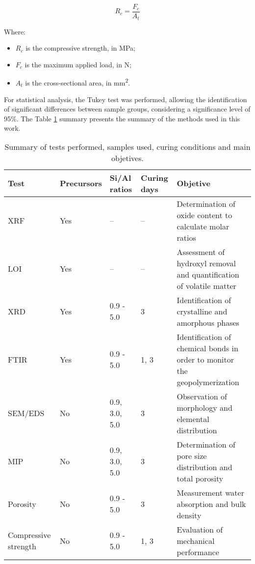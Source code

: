 \begin{equation}
    \label{eq:compressive_strength}
    R_c = \frac{F_c}{A_t}
\end{equation}

Where:
\begin{itemize}
    \item $R_c$ is the compressive strength, in MPa;
    \item $F_c$ is the maximum applied load, in N;
    \item $A_t$ is the cross-sectional area, in mm\textsuperscript{2}.
\end{itemize}

For statistical analysis, the Tukey test was performed, allowing the identification of significant differences between sample groups, considering a significance level of 95\%.
The Table \ref{tab:tests_summary} summary presents the summary of the methods used in this work.

\begin{table}[H]
    \centering
    \caption{Summary of tests performed, samples used, curing conditions and main objetives.}
    \label{tab:tests_summary}
    \begin{tabular}{p{2.5cm} p{2cm} p{2.5cm} p{2.5cm} p{4.5cm}}
    \hline
        Test & Precursors & Si/Al ratios & Curing days & Objetive \\
        \hline
        XRF & Yes & -- & -- & Determination of oxide content to calculate molar ratios \\
        LOI & Yes & -- & -- & Assessment of hydroxyl removal and quantification of volatile matter \\
        XRD & Yes & 0.9 - 5.0 & 3 & Identification of crystalline and amorphous phases \\
        FTIR & Yes & 0.9 - 5.0 & 1, 3 & Identification of chemical bonds in order to monitor the geopolymerization \\
        SEM/EDS & No & 0.9, 3.0, 5.0 & 3 & Observation of morphology and elemental distribution \\
        MIP & No & 0.9, 3.0, 5.0 & 3 & Determination of pore size distribution and total porosity \\
        Porosity & No & 0.9 - 5.0 & 3 & Measurement water absorption and bulk density \\
        Compressive strength & No & 0.9 - 5.0 & 1, 3 & Evaluation of mechanical performance \\
        \hline
    \end{tabular}
\end{table}

